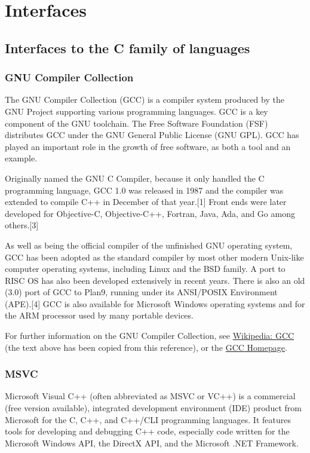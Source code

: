 
\chapter{Interfaces} 

\section{Interfaces to the C family of languages}

\subsection{GNU Compiler Collection}
The GNU Compiler Collection (GCC) is a compiler system produced by the GNU Project supporting various programming languages. GCC is a key component of the GNU toolchain. The Free Software Foundation (FSF) distributes GCC under the GNU General Public License (GNU GPL). GCC has played an important role in the growth of free software, as both a tool and an example.

\vpara
Originally named the GNU C Compiler, because it only handled the C programming language, GCC 1.0 was released in 1987 and the compiler was extended to compile C++ in December of that year.[1] Front ends were later developed for Objective-C, Objective-C++, Fortran, Java, Ada, and Go among others.[3]

\vpara
As well as being the official compiler of the unfinished GNU operating system, GCC has been adopted as the standard compiler by most other modern Unix-like computer operating systems, including Linux and the BSD family. A port to RISC OS has also been developed extensively in recent years. There is also an old (3.0) port of GCC to Plan9, running under its ANSI/POSIX Environment (APE).[4] GCC is also available for Microsoft Windows operating systems and for the ARM processor used by many portable devices.

\vpara
For further information on the GNU Compiler Collection, see \href{http://en.wikipedia.org/wiki/GNU_Compiler_Collection}{Wikipedia: GCC} (the text above has been copied from this reference), or the  \href{http://gcc.gnu.org/}{GCC Homepage}.


\subsection{MSVC}
Microsoft Visual C++ (often abbreviated as MSVC or VC++) is a commercial (free version available), integrated development environment (IDE) product from Microsoft for the C, C++, and C++/CLI programming languages. It features tools for developing and debugging C++ code, especially code written for the Microsoft Windows API, the DirectX API, and the Microsoft .NET Framework.

